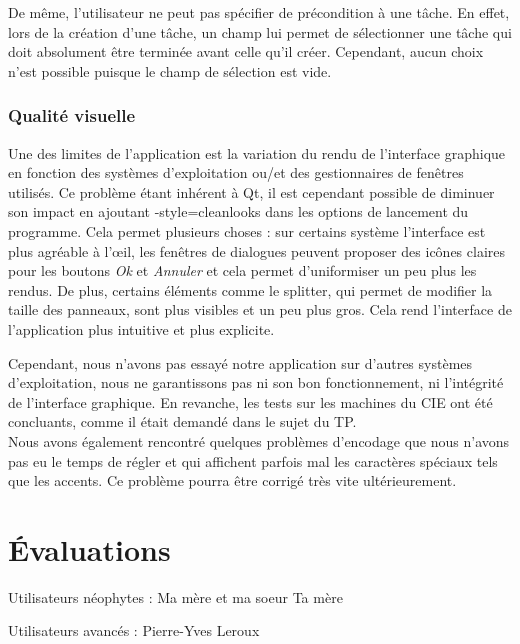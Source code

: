 			De même, l'utilisateur ne peut pas spécifier de précondition à une tâche. En effet, lors de la création d'une tâche, un champ lui permet de sélectionner une tâche qui doit absolument être terminée avant celle qu'il créer. Cependant, aucun choix n'est possible puisque le champ de sélection est vide.
			
		
		\subsection{Qualité visuelle}
			Une des limites de l'application est la variation du rendu de l'interface graphique en fonction des systèmes d'exploitation ou/et des gestionnaires de fenêtres utilisés. Ce problème étant inhérent à Qt, il est cependant possible de diminuer son impact en ajoutant \og -style=cleanlooks \fg dans les options de lancement du programme. Cela permet plusieurs choses : sur certains système l'interface est plus agréable à l'{\oe}il, les fenêtres de dialogues peuvent proposer des icônes claires pour les boutons \emph{Ok} et \emph{Annuler} et cela permet d'uniformiser un peu plus les rendus. De plus, certains éléments comme le splitter, qui permet de modifier la taille des panneaux, sont plus visibles et un peu plus gros. Cela rend l'interface de l'application plus intuitive et plus explicite.
	
			Cependant, nous n'avons pas essayé notre application sur d'autres systèmes d'exploitation, nous ne garantissons pas ni son bon fonctionnement, ni l'intégrité de l'interface graphique. En revanche, les tests sur les machines du CIE ont été concluants, comme il était demandé dans le sujet du TP.\\
			
			Nous avons également rencontré quelques problèmes d'encodage que nous n'avons pas eu le temps de régler et qui affichent parfois mal les caractères spéciaux tels que les accents. Ce problème pourra être corrigé très vite ultérieurement.


\chapter{Évaluations}
	
	Utilisateurs néophytes :
		Ma mère et ma soeur
		Ta mère
		
	Utilisateurs avancés :
		Pierre-Yves
		Leroux

